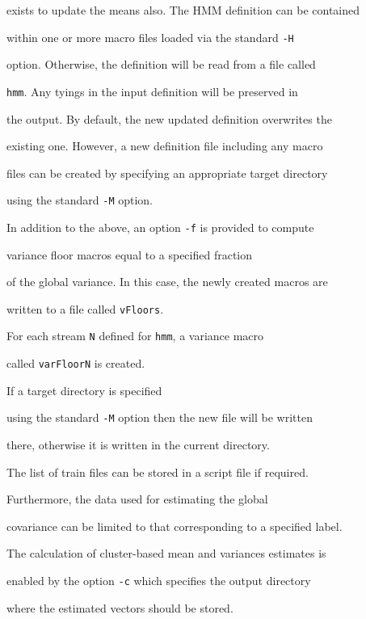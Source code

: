 exists to update the means also.  The HMM definition can be contained


within one or more macro files loaded via the standard \texttt{-H}


option.  Otherwise, the definition will be read from a file called


\texttt{hmm}.  Any tyings in the input definition will be preserved in


the output. By default, the new updated definition overwrites the


existing one.  However, a new definition file including any macro


files can be created by specifying an appropriate target directory


using the standard \texttt{-M} option.





In addition to the above, an option \texttt{-f} is provided to compute


variance floor macros equal to a specified fraction


of the global variance.  In this case, the newly created macros are


written to a file called \texttt{vFloors}.  


For each stream \texttt{N} defined for \texttt{hmm},  a variance macro 


called \texttt{varFloorN} is created.


If a target directory is specified


using the standard \texttt{-M} option then the new file will be written


there, otherwise it is written in the current directory.





The list of train files can be stored in a script file if required.


Furthermore, the data used for estimating the global


covariance can be limited to that corresponding to a specified label.








The calculation of cluster-based mean and variances estimates is


enabled by the option \texttt{-c} which specifies the output directory


where the estimated vectors should be stored.





